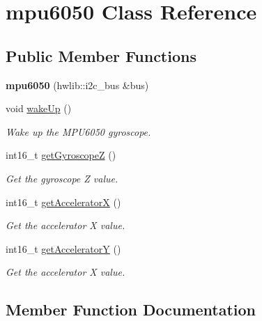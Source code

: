 \hypertarget{classmpu6050}{}\section{mpu6050 Class Reference}
\label{classmpu6050}
\subsection*{Public Member Functions}
\begin{DoxyCompactItemize}
\item 
\mbox{\label{classmpu6050_abe54df5d2a971f90ee41e243dd21d611}} 
{\bfseries mpu6050} (hwlib\+::i2c\+\_\+bus \&bus)
\item 
void \hyperlink{classmpu6050_abf7874fc328913b17c22c86f3a01ee6e}{wake\+Up} ()
\begin{DoxyCompactList}\small\item\em Wake up the M\+P\+U6050 gyroscope. \end{DoxyCompactList}\item 
int16\+\_\+t \hyperlink{classmpu6050_af1dcb00f30964e8ea1f20b1f4105b46a}{get\+GyroscopeZ} ()
\begin{DoxyCompactList}\small\item\em Get the gyroscope Z value. \end{DoxyCompactList}\item 
int16\+\_\+t \hyperlink{classmpu6050_a2f8aade3ba8a2b178c79a67edc314db4}{get\+AcceleratorX} ()
\begin{DoxyCompactList}\small\item\em Get the accelerator X value. \end{DoxyCompactList}\item 
int16\+\_\+t \hyperlink{classmpu6050_ae4dce81dd2af2fc9288b2f3966f59333}{get\+AcceleratorY} ()
\begin{DoxyCompactList}\small\item\em Get the accelerator X value. \end{DoxyCompactList}\end{DoxyCompactItemize}


\subsection{Member Function Documentation}
\mbox{\label{classmpu6050_a2f8aade3ba8a2b178c79a67edc314db4}} 
